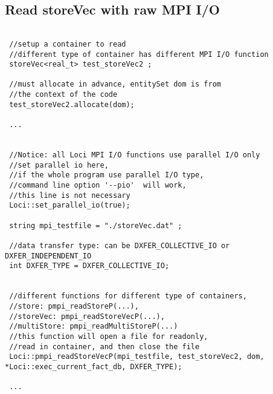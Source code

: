 \documentclass{article}
\begin{document}
\subsection {Read storeVec with raw MPI I/O}
\begin{lstlisting}
 
 //setup a container to read 
 //different type of container has different MPI I/O function 
 storeVec<real_t> test_storeVec2 ;
 
 //must allocate in advance, entitySet dom is from
 //the context of the code
 test_storeVec2.allocate(dom);

 ...
 

 //Notice: all Loci MPI I/O functions use parallel I/O only 
 //set parallel io here,
 //if the whole program use parallel I/O type, 
 //command line option '--pio'  will work,
 //this line is not necessary 
 Loci::set_parallel_io(true); 

 string mpi_testfile = "./storeVec.dat" ;
 
 //data transfer type: can be DXFER_COLLECTIVE_IO or DXFER_INDEPENDENT_IO
 int DXFER_TYPE = DXFER_COLLECTIVE_IO;
 

 //different functions for different type of containers, 
 //store: pmpi_readStoreP(...),
 //storeVec: pmpi_readStoreVecP(...), 
 //multiStore: pmpi_readMultiStoreP(...) 
 //this function will open a file for readonly, 
 //read in container, and then close the file
 Loci::pmpi_readStoreVecP(mpi_testfile, test_storeVec2, dom, *Loci::exec_current_fact_db, DXFER_TYPE); 
 
 ...
\end{lstlisting}
\end{document}
